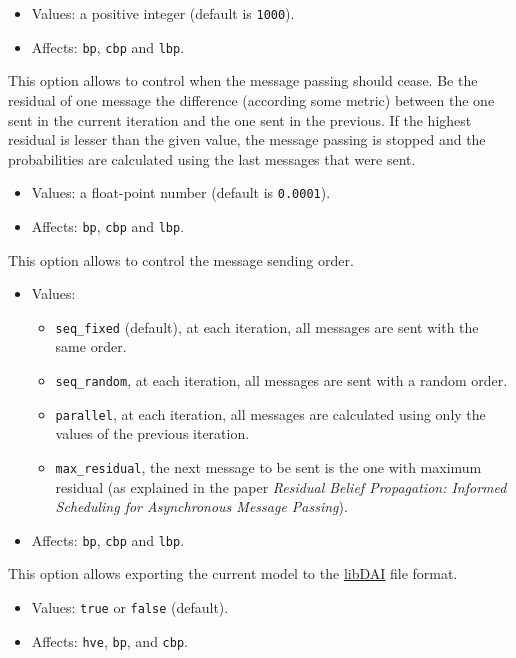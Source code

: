 \documentclass{article}
\begin{document}
\begin{itemize}
  \item Values: a positive integer (default is \texttt{1000}).
  \item Affects: \texttt{bp}, \texttt{cbp} and \texttt{lbp}.
\end{itemize}


This option allows to control when the message passing should cease. Be the residual of one message the difference (according some metric) between the one sent in the current iteration and the one sent in the previous. If the highest residual is lesser than the given value, the message passing is stopped and the probabilities are calculated using the last messages that were sent.

\begin{itemize}
  \item Values: a float-point number (default is \texttt{0.0001}).
  \item Affects: \texttt{bp}, \texttt{cbp} and \texttt{lbp}.
\end{itemize}


This option allows to control the message sending order.
\begin{itemize}
  \item Values:
\begin{itemize}
 \item \texttt{seq\_fixed} (default), at each iteration, all messages are sent with the same order.

 \item \texttt{seq\_random}, at each iteration, all messages are sent with a random order.

 \item \texttt{parallel}, at each iteration, all messages are calculated using only the values of the previous iteration.

 \item \texttt{max\_residual}, the next message to be sent is the one with maximum residual (as explained in the paper \textit{Residual Belief Propagation: Informed Scheduling for Asynchronous Message Passing}).
\end{itemize}
  \item Affects: \texttt{bp}, \texttt{cbp} and \texttt{lbp}.
\end{itemize}


This option allows exporting the current model to the \href{http://cs.ru.nl/~jorism/libDAI/doc/fileformats.html}{libDAI} file format.
\begin{itemize}
  \item Values: \texttt{true} or \texttt{false} (default).
  \item Affects: \texttt{hve}, \texttt{bp}, and \texttt{cbp}.
\end{itemize}
\end{document}
